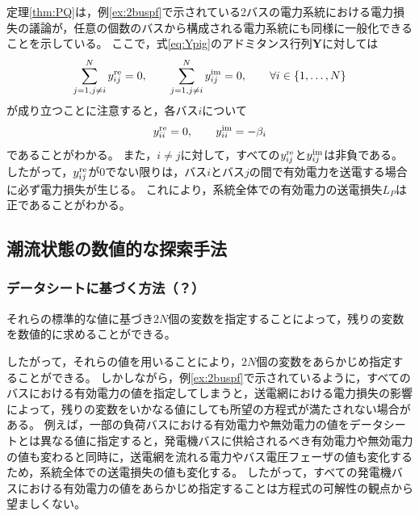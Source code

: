 \documentclass[tombow,dvipdfmx]{corona-a5}
\begin{document}
定理\ref{thm:PQ}は，例\ref{ex:2buspf}で示されている2バスの電力系統における電力損失の議論が，任意の個数のバスから構成される電力系統にも同様に一般化できることを示している。
ここで，式\ref{eq:Ypig}のアドミタンス行列$\bm{Y}$に対しては
\begin{align*}
\sum_{j=1,j\neq i}^N  y^{\rm re}_{ij} =0
,\qquad
\sum_{j=1,j\neq i}^N  y^{\rm im}_{ij} =0
,\qquad
\forall i \in \{1,\ldots,N\}
\end{align*}
が成り立つことに注意すると，各バス$i$について
\begin{align*}
y^{\rm re}_{ii}=0,\qquad
y^{\rm im}_{ii}= - \beta_i
\end{align*}
であることがわかる。
また，$i\neq j$に対して，すべての$y^{\rm re}_{ij} $と$y^{\rm im}_{ij}$は非負である。
したがって，$y^{\rm re}_{ij}$が0でない限りは，バス$i$とバス$j$の間で有効電力を送電する場合に必ず電力損失が生じる。
これにより，系統全体での有効電力の送電損失$L_P$は正であることがわかる。


\subsection{潮流状態の数値的な探索手法}

\subsubsection{データシートに基づく方法（？）}

それらの標準的な値に基づき$2N$個の変数を指定することによって，残りの変数を数値的に求めることができる。

したがって，それらの値を用いることにより，$2N$個の変数をあらかじめ指定することができる。
しかしながら，例\ref{ex:2buspf}で示されているように，すべてのバスにおける有効電力の値を指定してしまうと，送電網における電力損失の影響によって，残りの変数をいかなる値にしても所望の方程式が満たされない場合がある。
例えば，一部の負荷バスにおける有効電力や無効電力の値をデータシートとは異なる値に指定すると，発電機バスに供給されるべき有効電力や無効電力の値も変わると同時に，送電網を流れる電力やバス電圧フェーザの値も変化するため，系統全体での送電損失の値も変化する。
したがって，すべての発電機バスにおける有効電力の値をあらかじめ指定することは方程式の可解性の観点から望ましくない。
\end{document}
